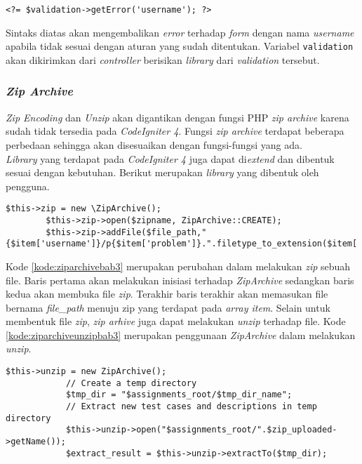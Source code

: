 \begin{center}
\verb|<?= $validation->getError('username'); ?>|
\end{center}

Sintaks diatas akan mengembalikan \textit{error} terhadap \textit{form} dengan nama \textit{username} apabila tidak sesuai dengan aturan yang sudah ditentukan. Variabel \texttt{validation} akan dikirimkan dari \textit{controller} berisikan \textit{library} dari \textit{validation} tersebut.

\subsubsection{\textit{Zip Archive}}
\label{subsubsec:ziparchivebab3}
\textit{Zip Encoding} dan \textit{Unzip} akan digantikan dengan fungsi PHP \textit{zip archive} karena sudah tidak tersedia pada \textit{CodeIgniter 4}. Fungsi \textit{zip archive} terdapat beberapa perbedaan sehingga akan disesuaikan dengan fungsi-fungsi yang ada.
\\
\textit{Library} yang terdapat pada \textit{CodeIgniter 4} juga dapat di\textit{extend} dan dibentuk sesuai dengan kebutuhan. Berikut merupakan \textit{library} yang dibentuk oleh pengguna.

\begin{lstlisting}[caption=Contoh perubahan penggunaan\textit{library ZipArhive} untuk melakukan \textit{zip}, label=kode:ziparchivebab3]
		$this->zip = new \ZipArchive();
		$this->zip->open($zipname, ZipArchive::CREATE);
		$this->zip->addFile($file_path,"{$item['username']}/p{$item['problem']}.".filetype_to_extension($item['file_type']));
\end{lstlisting}

Kode \ref{kode:ziparchivebab3} merupakan perubahan dalam melakukan \textit{zip} sebuah file. Baris pertama akan melakukan inisiasi terhadap \textit{ZipArchive} sedangkan baris kedua akan membuka file \textit{zip}. Terakhir baris terakhir akan memasukan file bernama \textit{file\_path} menuju zip yang terdapat pada \textit{array item}. Selain untuk membentuk file \textit{zip}, \textit{zip arhive} juga dapat melakukan \textit{unzip} terhadap file. Kode \ref{kode:ziparchiveunzipbab3} merupakan penggunaan \textit{ZipArchive} dalam melakukan \textit{unzip}.
\begin{lstlisting}[caption=Contoh perubahan penggunaan\textit{library ZipArhive} untuk melakukan \textit{unzip}, label=kode:ziparchiveunzipbab3]
		$this->unzip = new ZipArchive();
			// Create a temp directory
			$tmp_dir = "$assignments_root/$tmp_dir_name";
			// Extract new test cases and descriptions in temp directory
			$this->unzip->open("$assignments_root/".$zip_uploaded->getName());
			$extract_result = $this->unzip->extractTo($tmp_dir);
\end{lstlisting}

